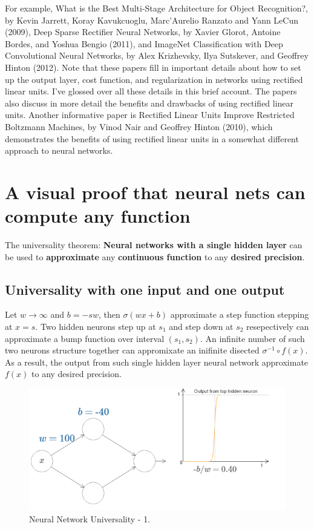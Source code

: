 \documentclass[]{book}
\begin{document}
For example, What is the Best Multi-Stage Architecture for Object
Recognition?, by Kevin Jarrett, Koray Kavukcuoglu, Marc'Aurelio Ranzato
and Yann LeCun (2009), Deep Sparse Rectiﬁer Neural Networks, by Xavier
Glorot, Antoine Bordes, and Yoshua Bengio (2011), and ImageNet
Classification with Deep Convolutional Neural Networks, by Alex
Krizhevsky, Ilya Sutskever, and Geoffrey Hinton (2012). Note that these
papers fill in important details about how to set up the output layer,
cost function, and regularization in networks using rectified linear
units. I've glossed over all these details in this brief account. The
papers also discuss in more detail the benefits and drawbacks of using
rectified linear units. Another informative paper is Rectified Linear
Units Improve Restricted Boltzmann Machines, by Vinod Nair and Geoffrey
Hinton (2010), which demonstrates the benefits of using rectified linear
units in a somewhat different approach to neural networks.

\chapter{A visual proof that neural nets can compute any
function}\label{vsnn}

The universality theorem: \textbf{Neural networks with a single hidden
layer} can be used to \textbf{approximate} any \textbf{continuous
function} to any \textbf{desired precision}.

\section{Universality with one input and one
output}\label{universality-with-one-input-and-one-output}

Let \(w \to \infty\) and \(b = -sw\), then \(\sigma(wx+b)\) approximate
a step function stepping at \(x = s\). Two hidden neurons step up at
\(s_1\) and step down at \(s_2\) resepectively can approximate a bump
function over interval \((s_1, s_2)\). An infinite number of such two
neurons structure together can appromixate an inifinite disected
\(\sigma^{-1} \circ f(x)\). As a result, the output from such single
hidden layer neural network approximate \(f(x)\) to any desired
precision.

\begin{figure}

{\centering \includegraphics[width=0.75\linewidth]{fig/04_tikz41} 

}

\caption{Neural Network Universality - 1.}\label{fig:vsnn-nnup-01}
\end{figure}
\end{document}
